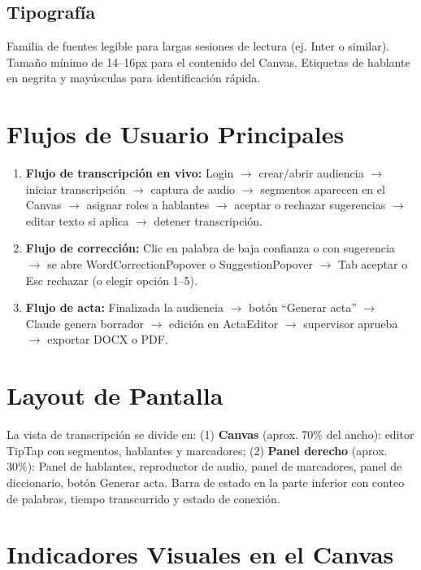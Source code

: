 \documentclass[12pt,a4paper]{report}
\begin{document}
\subsection{Tipografía}

Familia de fuentes legible para largas sesiones de lectura (ej. Inter o similar). Tamaño mínimo de 14--16px para el contenido del Canvas. Etiquetas de hablante en negrita y mayúsculas para identificación rápida.

\section{Flujos de Usuario Principales}

\begin{enumerate}
    \item \textbf{Flujo de transcripción en vivo:} Login $\to$ crear/abrir audiencia $\to$ iniciar transcripción $\to$ captura de audio $\to$ segmentos aparecen en el Canvas $\to$ asignar roles a hablantes $\to$ aceptar o rechazar sugerencias $\to$ editar texto si aplica $\to$ detener transcripción.
    \item \textbf{Flujo de corrección:} Clic en palabra de baja confianza o con sugerencia $\to$ se abre WordCorrectionPopover o SuggestionPopover $\to$ Tab aceptar o Esc rechazar (o elegir opción 1--5).
    \item \textbf{Flujo de acta:} Finalizada la audiencia $\to$ botón ``Generar acta'' $\to$ Claude genera borrador $\to$ edición en ActaEditor $\to$ supervisor aprueba $\to$ exportar DOCX o PDF.
\end{enumerate}

\section{Layout de Pantalla}

La vista de transcripción se divide en: (1) \textbf{Canvas} (aprox. 70\% del ancho): editor TipTap con segmentos, hablantes y marcadores; (2) \textbf{Panel derecho} (aprox. 30\%): Panel de hablantes, reproductor de audio, panel de marcadores, panel de diccionario, botón Generar acta. Barra de estado en la parte inferior con conteo de palabras, tiempo transcurrido y estado de conexión.

\section{Indicadores Visuales en el Canvas}
\end{document}
